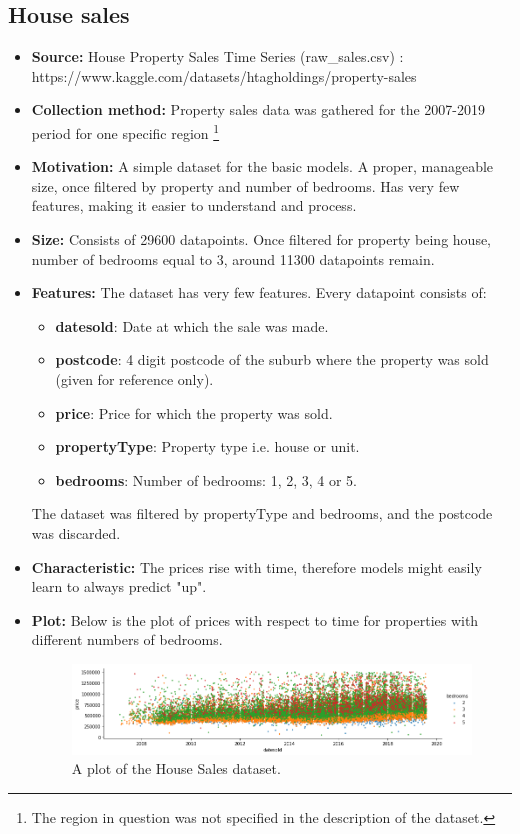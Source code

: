 \subsection{House sales}
\begin{itemize}
	\item \textbf{Source:} House Property Sales Time Series (raw\_sales.csv) :\\ https://www.kaggle.com/datasets/htagholdings/property-sales
	\item \textbf{Collection method:} Property sales data was gathered for the 2007-2019 period for one specific region \footnote{The region in question was not specified in the description of the dataset.}
	\item \textbf{Motivation:} A simple dataset for the basic models. A proper, manageable size, once filtered by property and number of bedrooms. Has very few features, making it easier to understand and process.
	\item \textbf{Size:} Consists of 29600 datapoints. Once filtered for property being house, number of bedrooms equal to 3, around 11300 datapoints remain.
	\item \textbf{Features:} The dataset has very few features. Every datapoint consists of:
	      \begin{itemize}
		      \item \textbf{datesold}: Date at which the sale was made.
		      \item \textbf{postcode}: 4 digit postcode of the suburb where the property was sold (given for reference only).
		      \item \textbf{price}: Price for which the property was sold.
		      \item \textbf{propertyType}: Property type i.e. house or unit.
		      \item \textbf{bedrooms}: Number of bedrooms: 1, 2, 3, 4 or 5.
	      \end{itemize}
	      The dataset was filtered by propertyType and bedrooms, and the postcode was discarded.

	\item \textbf{Characteristic:} The prices rise with time, therefore models might easily learn to always predict "up".

	\item \textbf{Plot:} Below is the plot of prices with respect to time for properties with different numbers of bedrooms.
	      \begin{figure}[h!]
		      \includegraphics[width=\linewidth]{"pictures/house_sales_graph.png"}
		      \caption{A plot of the House Sales dataset.}
		      \label{fig:house_sales_graph}
	      \end{figure}
\end{itemize}
